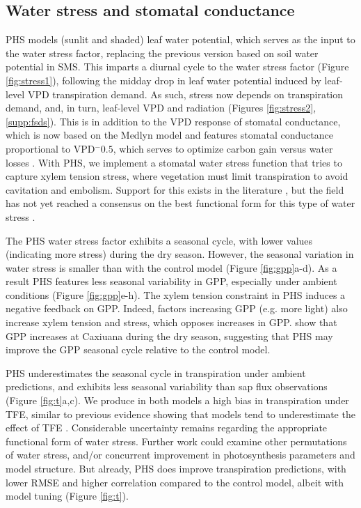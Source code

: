\documentclass[draft,linenumbers]{agujournal}
\begin{document}
\subsection{Water stress and stomatal conductance}
    \label{sect:stress}

    PHS models (sunlit and shaded) leaf water potential, which serves as the input to the water stress factor, 
    replacing the previous version based on soil water potential in SMS.
    This imparts a diurnal cycle to the water stress factor (Figure \ref{fig:stress1}), following the midday drop in leaf water potential induced by leaf-level VPD transpiration demand.
    As such, stress now depends on transpiration demand, and, in turn, leaf-level VPD and radiation (Figures \ref{fig:stress2},\ref{supp:fsds}).
    This is in addition to the VPD response of stomatal conductance, which is now based on the Medlyn model and features stomatal conductance proportional to VPD$^-0.5$, which serves to optimize carbon gain versus water losses \citep{medlyn2011}.
    With PHS, we implement a stomatal water stress function that tries to capture xylem tension stress, where vegetation must limit transpiration to avoid cavitation and embolism. Support for this exists in the literature \citep{novick2016a,sperry2017}, but the field has not yet reached a consensus on the best functional form for this type of water stress \citep{zhou2013}. 
    
    The PHS water stress factor exhibits a seasonal cycle, with lower values (indicating more stress) during the dry season.  
    However, the seasonal variation in water stress is smaller than with the control model (Figure \ref{fig:gpp}a-d).
    As a result PHS features less seasonal variability in GPP, especially under ambient conditions (Figure \ref{fig:gpp}e-h).
    The xylem tension constraint in PHS induces a negative feedback on GPP.
    Indeed, factors increasing GPP (e.g. more light) also increase xylem tension and stress, which opposes increases in GPP.
    \cite{restrepo2017} show that GPP increases at Caxiuana during the dry season, suggesting that PHS may improve the GPP seasonal cycle relative to the control model.
    
    PHS underestimates the seasonal cycle in transpiration under ambient predictions, and exhibits less seasonal variability than sap flux observations (Figure \ref{fig:t}a,c).
    We produce in both models a high bias in transpiration under TFE, similar to previous evidence showing that models tend to underestimate the effect of TFE \citep{powell2013}.
    Considerable uncertainty remains regarding the appropriate functional form of water stress.
    Further work could examine other permutations of water stress, and/or concurrent improvement in photosynthesis parameters and model structure.
    But already, PHS does improve transpiration predictions, 
    with lower RMSE and higher correlation compared to the control model, albeit with model tuning (Figure \ref{fig:t}).
\end{document}
